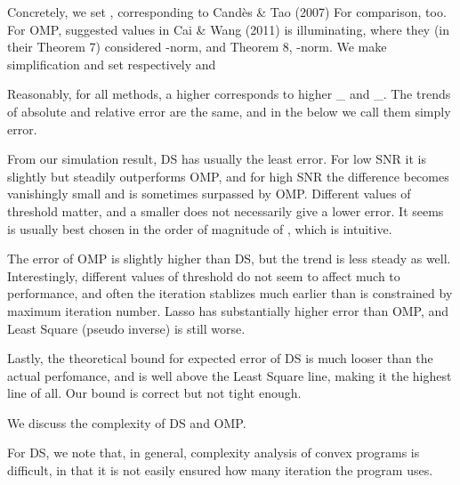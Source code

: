 Concretely, we set , corresponding to Cand\`es \& Tao (2007)
For comparison,  too.
For OMP, suggested values in Cai \& Wang (2011) is illuminating, where they (in their Theorem 7) considered -norm, and Theorem 8, \m {\ell _\infty}-norm.
We make simplification and set respectively  and 

\stopsubsection

\startsubsection [title={Plots}]

\stopsubsection

\startsubsection [title={Discussion}]

Reasonably, for all methods, a higher \m {\s} corresponds to higher \eta_{} and \eta_{}.
The trends of absolute and relative error are the same, and in the below we call them simply error.

From our simulation result, DS has usually the least error.
For low SNR it is slightly but steadily outperforms OMP, and for high SNR the difference becomes vanishingly small and is sometimes surpassed by OMP.
Different values of threshold  matter, and a smaller  does not necessarily give a lower error.
It seems  is usually best chosen in the order of magnitude of \m {\s}, which is intuitive.

The error of OMP is slightly higher than DS, but the trend is less steady as well.
Interestingly, different values of threshold \m {\eta} do not seem to affect much to performance, and often the iteration stablizes much earlier than is constrained by maximum iteration number.
Lasso has substantially higher error than OMP, and Least Square (pseudo inverse) is still worse.

Lastly, the theoretical bound for expected error of DS is much looser than the actual perfomance, and is well above the Least Square line, making it the highest line of all.
Our bound is correct but not tight enough.

\stopsection

\startsection [title={Complexity}]

\startsubsection [title={Asymtotic Analysis}]

We discuss the complexity of DS and OMP.

For DS, we note that, in general, complexity analysis of convex programs is difficult, in that it is not easily ensured how many iteration the program uses.

